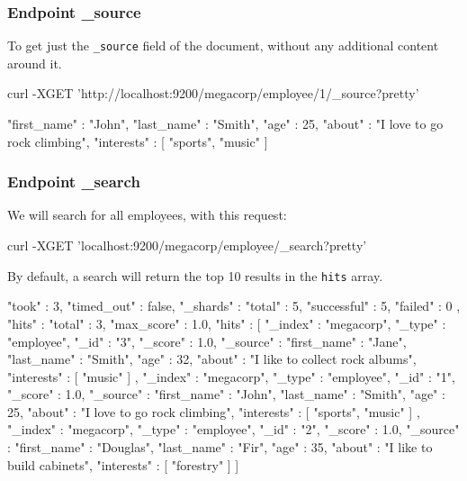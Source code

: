 \documentclass{article}%
\begin{document}
\subsubsection{Endpoint \_source}

To get just the \texttt{\_source} field of the document, without any additional content around it.

\begin{command}
curl -XGET 'http://localhost:9200/megacorp/employee/1/_source?pretty'
\end{command}

\begin{command}
{
	"first_name" : "John",
	"last_name"  : "Smith",
	"age"        : 25,
	"about"      : "I love to go rock climbing",
	"interests"  : [ "sports", "music" ]
}
\end{command}

\subsubsection{Endpoint \_search}

We will search for all employees, with this request:
\begin{command}
curl -XGET 'localhost:9200/megacorp/employee/_search?pretty'
\end{command}

By default, a search will return the top 10 results in the \texttt{hits} array.

\begin{command}
{
	"took" : 3,
	"timed_out" : false,
	"_shards" : {
		"total" : 5,
		"successful" : 5,
		"failed" : 0
	},
	"hits" : {
		"total" : 3,
		"max_score" : 1.0,
		"hits" : [ {
 			"_index" : "megacorp",
 			"_type" : "employee",
 			"_id" : "3",
 			"_score" : 1.0,
 			"_source" : {
				"first_name" : "Jane",
				"last_name"  : "Smith",
				"age"        : 32,
				"about"      : "I like to collect rock albums",
				"interests"  : [ "music" ]
			}
		}, {
			"_index" : "megacorp",
			"_type" : "employee",
			"_id" : "1",
			"_score" : 1.0,
			"_source" : {
				"first_name" : "John",
				"last_name"  : "Smith",
				"age"        : 25,
				"about"      : "I love to go rock climbing",
				"interests"  : [ "sports", "music" ]
			}
		}, {
			"_index" : "megacorp",
			"_type" : "employee",
			"_id" : "2",
			"_score" : 1.0,
			"_source" : {
				"first_name" : "Douglas",
				"last_name"  : "Fir",
				"age"        : 35,
				"about"      : "I like to build cabinets",
				"interests"  : [ "forestry" ]
			}
		}
	] }
}
\end{command}
\end{document}
